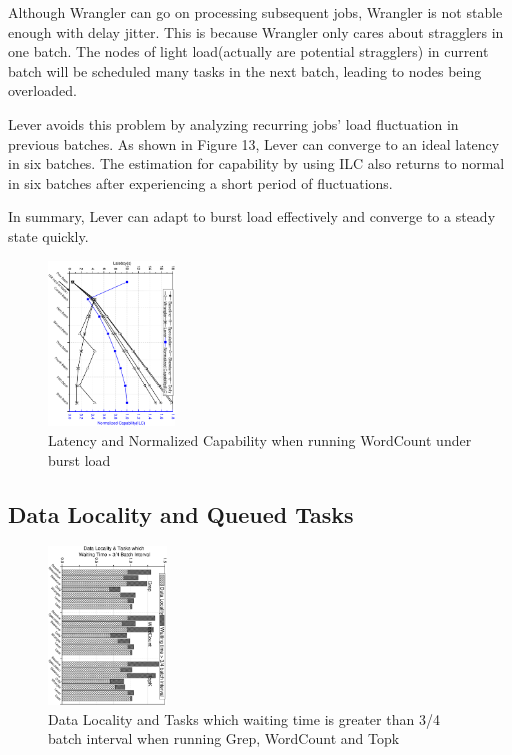 \documentclass[10pt,conference,compsocconf,letterpaper]{IEEEtran}
\begin{document}
  Although Wrangler can go on processing subsequent jobs, Wrangler is not stable enough with delay jitter. This is because Wrangler only cares about stragglers in one batch. The nodes of light load(actually are potential stragglers) in current batch will be scheduled many tasks in the next batch, leading to nodes being overloaded.

  Lever avoids this problem by analyzing recurring jobs' load fluctuation in previous batches. As shown in Figure 13, Lever can converge to an ideal latency in six batches. The estimation for capability by using ILC also returns to normal in six batches after experiencing a short period of fluctuations.

  In summary, Lever can adapt to burst load effectively and converge to a steady state quickly.
  \begin{figure}[htbp]
    \centering
    \includegraphics[width=0.30\textwidth, angle=90]{FigureAdapBurst}
    \caption{Latency and Normalized Capability when running WordCount under burst load}
    \label{Fig. 13:}
  \end{figure}

\subsection{Data Locality and Queued Tasks}

  \begin{figure}[htbp]
    \centering
    \includegraphics[width=0.28\textwidth, angle=90]{FigureDLWT}
    \caption{Data Locality and Tasks which waiting time is greater than 3/4 batch interval when running Grep, WordCount and Topk}
    \label{Fig. 14:}
  \end{figure}
\end{document}
